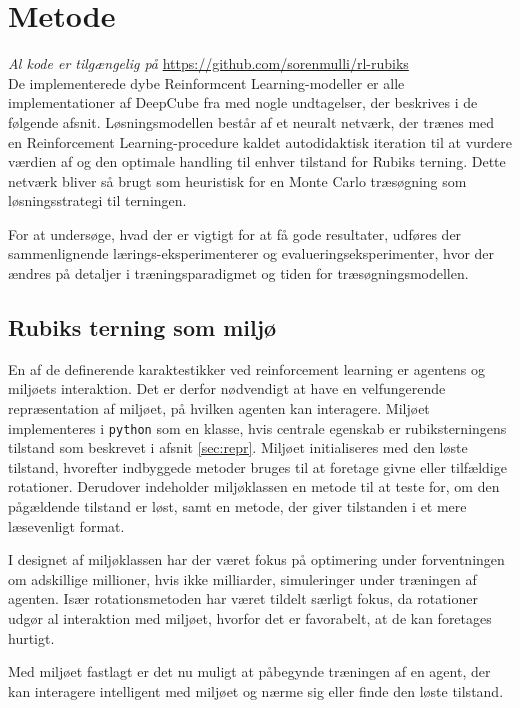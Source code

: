 \documentclass[../main.tex]{subfiles}
\begin{document}
\chapter{Metode}\label{chp:methods}
\textit{Al kode er tilgængelig på} \url{https://github.com/sorenmulli/rl-rubiks}
\\
De implementerede dybe Reinformcent Learning-modeller  er alle implementationer af DeepCube fra \cite{HumansBeGone} med nogle undtagelser, der beskrives i de følgende afsnit.
Løsningsmodellen består af et neuralt netværk, der trænes med en Reinforcement Learning-procedure kaldet autodidaktisk iteration til at vurdere værdien af og den optimale handling til enhver tilstand for Rubiks terning.
Dette netværk bliver så brugt som heuristisk for en Monte Carlo træsøgning som løsningsstrategi til terningen.

For at undersøge, hvad der er vigtigt for at få gode resultater, udføres der sammenlignende lærings-eksperimenterer og evalueringseksperimenter, hvor der ændres på detaljer i træningsparadigmet og tiden for træsøgningsmodellen. 

\section{Rubiks terning som miljø}\label{sec:environment}
En af de definerende karaktestikker ved reinforcement learning er agentens og miljøets interaktion.
Det er derfor nødvendigt at have en velfungerende repræsentation af miljøet, på hvilken agenten kan interagere.
Miljøet implementeres i \texttt{python} som en klasse, hvis centrale egenskab er rubiksterningens tilstand som beskrevet i afsnit \ref{sec:repr}.
Miljøet initialiseres med den løste tilstand, hvorefter indbyggede metoder bruges til at foretage givne eller tilfældige rotationer.
Derudover indeholder miljøklassen en metode til at teste for, om den pågældende tilstand er løst, samt en metode, der giver tilstanden i et mere læsevenligt format.

I designet af miljøklassen har der været fokus på optimering under forventningen om adskillige millioner, hvis ikke milliarder, simuleringer under træningen af agenten.
Især rotationsmetoden har været tildelt særligt fokus, da rotationer udgør al interaktion med miljøet, hvorfor det er favorabelt, at de kan foretages hurtigt.

Med miljøet fastlagt er det nu muligt at påbegynde træningen af en agent, der kan interagere intelligent med miljøet og nærme sig eller finde den løste tilstand.
\end{document}
